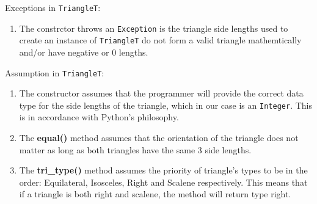 \documentclass[12pt]{article}
\begin{document}
\medskip
Exceptions in \verb|TriangleT|:
\begin{enumerate}
  \item The constrctor throws an \verb|Exception| is the triangle side lengths used to create an instance of \verb|TriangleT| do not form a valid triangle mathemtically and/or have negative or 0 lengths.
\end{enumerate}
Assumption in \verb|TriangleT|:
\begin{enumerate}
  \item The constructor assumes that the programmer will provide the correct data type for the side lengths of the triangle, which in our case is an \verb|Integer|. This is in accordance with Python's philosophy.
  \item The \textbf{equal()} method assumes that the orientation of the triangle does not matter as long as both triangles have the same 3 side lengths.
  \item The \textbf{tri\_type()} method assumes the priority of triangle's types to be in the order: Equilateral, Isosceles, Right and Scalene respectively. This means that if a triangle is both right and scalene, the method will return type right.
\end{enumerate}
\end{document}
